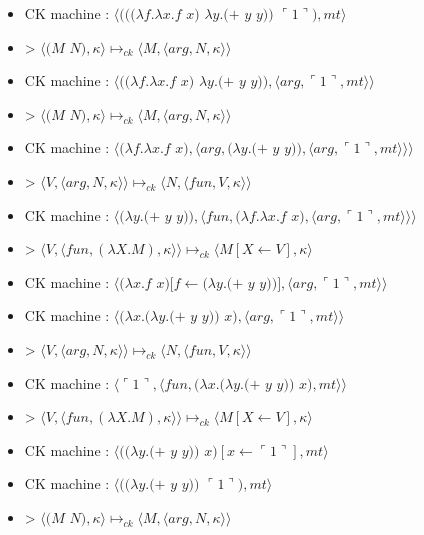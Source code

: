 \documentclass[10pt,a4paper]{article}
\begin{document}
					\begin{itemize}
						\item[] CK machine : $\langle(((\lambda f.\lambda x.f$ $x)$ $\lambda y.(+$ $y$ $y))$ $\ulcorner 1\urcorner),mt\rangle$
						\item[] > $\langle(M$ $N),\kappa\rangle \longmapsto_{ck} \langle M,\langle arg,N,\kappa\rangle\rangle$
						\item[] CK machine : $\langle((\lambda f.\lambda x.f$ $x)$ $\lambda y.(+$ $y$ $y)),\langle arg,\ulcorner 1\urcorner,mt\rangle\rangle$
						\item[] > $\langle(M$ $N),\kappa\rangle \longmapsto_{ck} \langle M,\langle arg,N,\kappa\rangle\rangle$
						\item[] CK machine : $\langle(\lambda f.\lambda x.f$ $x),\langle arg,(\lambda y.(+$ $y$ $y)),\langle arg,\ulcorner 1\urcorner,mt\rangle\rangle\rangle$	
						\item[] > $\langle V,\langle arg,N,\kappa \rangle \rangle \longmapsto_{ck} \langle N,\langle fun,V,\kappa \rangle \rangle$
						\item[] CK machine : $\langle(\lambda y.(+$ $y$ $y)),\langle fun,(\lambda f.\lambda x.f$ $x),\langle arg,\ulcorner 1\urcorner,mt\rangle\rangle\rangle$	
						\item[] > $\langle V,\langle fun,(\lambda X.M),\kappa \rangle \rangle \longmapsto_{ck} \langle M[X \leftarrow V],\kappa\rangle$
						\item[] CK machine : $\langle(\lambda x.f$ $x)[f\leftarrow(\lambda y.(+$ $y$ $y))],\langle arg,\ulcorner 1\urcorner,mt\rangle\rangle$	
						\item[] CK machine : $\langle(\lambda x.(\lambda y.(+$ $y$ $y))$ $x),\langle arg,\ulcorner 1\urcorner,mt\rangle\rangle$	
						\item[] > $\langle V,\langle arg,N,\kappa \rangle \rangle \longmapsto_{ck} \langle N,\langle fun,V,\kappa \rangle \rangle$
						\item[] CK machine : $\langle\ulcorner 1\urcorner,\langle fun,(\lambda x.(\lambda y.(+$ $y$ $y))$ $x),mt\rangle\rangle$
						\item[] > $\langle V,\langle fun,(\lambda X.M),\kappa \rangle \rangle \longmapsto_{ck} \langle M[X \leftarrow V],\kappa\rangle$		
						\item[] CK machine : $\langle((\lambda y.(+$ $y$ $y))$ $x)[x \leftarrow \ulcorner 1\urcorner ],mt\rangle$
						\item[] CK machine : $\langle((\lambda y.(+$ $y$ $y))$ $\ulcorner 1\urcorner),mt\rangle$
						\item[] > $\langle(M$ $N),\kappa\rangle \longmapsto_{ck} \langle M,\langle arg,N,\kappa\rangle\rangle$

\end{itemize}
\end{document}
